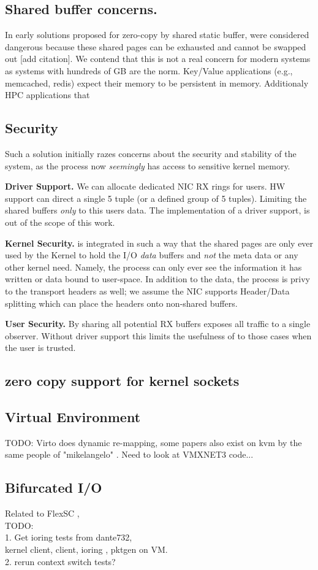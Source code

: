 \subsection{Shared buffer concerns.}
In early solutions proposed for zero-copy by shared static buffer, were considered dangerous because these shared pages can be exhausted and cannot be swapped out [add citation]. We contend that this is not a real concern for modern systems as systems with hundreds of GB are the norm. Key/Value applications (e.g., memcached, redis) expect their memory to be persistent in memory. Additionaly HPC applications that 

\subsection{Security}
Such a solution initially razes concerns about the security and stability of the system, as the process now \emph{seemingly} has access to sensitive kernel memory. 

\noindent\textbf{Driver Support.} We can allocate dedicated NIC RX rings for \oursys users. HW support\cite{flow_direct} can direct a single 5 tuple (or a defined group of 5 tuples). Limiting the shared buffers \emph{only} to this users data. The implementation of a driver support, is out of the scope of this work. 

\noindent\textbf{Kernel Security.} \oursys is integrated in such a way that the shared pages are only ever used by the Kernel to hold the I/O \emph{data} buffers and \emph{not} the meta data or any other kernel need. Namely, the process can only ever see the information it has written or data bound to user-space. In addition to the data, the process is privy to the transport headers as well; we assume the NIC supports Header/Data splitting\cite{hds} which can place the headers onto non-shared buffers.

\noindent\textbf{User Security.} By sharing all potential RX buffers \oursys exposes all traffic to a single observer.
Without driver support this limits the usefulness of \oursys to those cases when the user is trusted. 

\subsection{zero copy support for kernel sockets}
\subsection{Virtual Environment}
TODO: Virto does dynamic re-mapping, some papers also exist on kvm by the same people of "mikelangelo" \cite{mikelangelo}. Need to look at VMXNET3 code...
\subsection{Bifurcated I/O}
Related to FlexSC \cite{flexsc}, \\TODO:\\
1. Get ioring tests from dante732,\\
   kernel client, client, ioring , pktgen on VM.\\
2. rerun context switch tests?